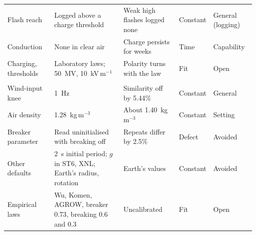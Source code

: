 \begin{table}[p]
\begin{tabularx}{\textwidth}{@{}>{\raggedright\arraybackslash}p{}LL>{\raggedright\arraybackslash}p{0.085\textwidth}>{\raggedright\arraybackslash}p{0.125\textwidth}@{}}
Flash reach & Logged above a charge threshold & Weak high flashes logged none & Constant & General (logging) \\
Conduction & None in clear air & Charge persists for weeks & Time & Capability \\
Charging, thresholds & Laboratory laws; 50~MV, 10~kV\,m$^{-1}$ & Polarity turns with the law & Fit & Open \\
\midrule
{} \\
Wind-input knee & 1~Hz & Similarity off by 5.44\% & Constant & General \\
Air density & 1.28~kg\,m$^{-3}$ & About 1.40~kg\,m$^{-3}$ & Constant & Setting \\
Breaker parameter & Read uninitialised with breaking off & Repeats differ by 2.5\% & Defect & Avoided \\
Other defaults & 2~s initial period; $g$ in ST6, XNL; Earth's radius, rotation & Earth's values & Constant & Avoided \\
Empirical laws & Wu, Komen, AGROW, breaker 0.73, breaking 0.6 and 0.3 & Uncalibrated & Fit & Open \\
\bottomrule
\end{tabularx}
\end{table}
